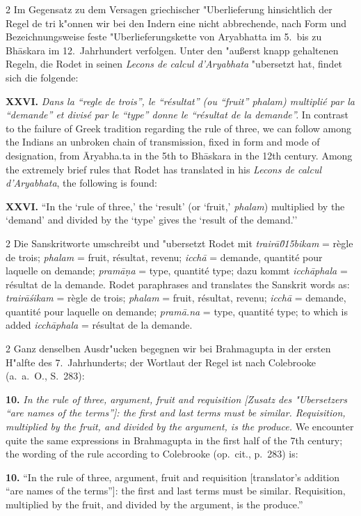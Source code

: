 \documentclass[10pt,a4paper]{article}
\renewcommand{\switchcolumn}{\syncronize\nointerlineskip\columnbreak}
\newcommand{\enquote}[1]{``#1''}
\begin{document}
\begin{paracol}{2}
Im Gegensatz zu dem Versagen griechischer "Uberlieferung hinsichtlich der Regel de tri k"onnen wir bei den Indern eine nicht abbrechende, nach Form und Bezeichnungsweise feste "Uberlieferungskette von Aryabhatta im 5.\ bis zu Bh\=askara im 12.\ Jahrhundert verfolgen. Unter den "au\ss{}erst knapp gehaltenen Regeln, die Rodet in seinen \textit{Lecons de calcul d'Aryabhata} "ubersetzt hat, findet sich die folgende:

\textbf{XXVI.} \textit{Dans la \enquote{regle de trois}, le \enquote{r\'esultat} (ou \enquote{fruit} \textit{phalam}) multipli\'e par la \enquote{demande} et divis\'e par le \enquote{type} donne le \enquote{r\'esultat de la demande}.}
\switchcolumn
In contrast to the failure of Greek tradition regarding the rule of three, we can follow among the Indians an unbroken chain of transmission, fixed in form and mode of designation, from \=Aryabha.ta in the 5th to Bh\=askara in the 12th century. Among the extremely brief rules that Rodet has translated in his \textit{Lecons de calcul d'Aryabhata}, the following is found:

\textbf{XXVI.} ``In the `rule of three,' the `result' (or `fruit,' \textit{phalam}) multiplied by the `demand' and divided by the `type' gives the `result of the demand.''
\end{paracol}

\begin{paracol}{2}
Die Sanskritworte umschreibt und "ubersetzt Rodet mit \textit{trair\=a\u015bikam} = r\`egle de trois; \textit{phalam} = fruit, r\'esultat, revenu; \textit{icch\=a} = demande, quantit\'e pour laquelle on demande; \textit{pram\=a\d{n}a} = type, quantit\'e type; dazu kommt \textit{icch\=aphala} = r\'esultat de la demande.
\switchcolumn
Rodet paraphrases and translates the Sanskrit words as: \textit{trair\=a\'sikam} = r\`egle de trois; \textit{phalam} = fruit, r\'esultat, revenu; \textit{icch\=a} = demande, quantit\'e pour laquelle on demande; \textit{pram\=a.na} = type, quantit\'e type; to which is added \textit{icch\=aphala} = r\'esultat de la demande.
\end{paracol}

\begin{paracol}{2}
Ganz denselben Ausdr"ucken begegnen wir bei Brahmagupta in der ersten H"alfte des 7.\ Jahrhunderts; der Wortlaut der Regel ist nach Colebrooke (a.\ a.\ O., S.\ 283):

\textbf{10.} \textit{In the rule of three, argument, fruit and requisition [Zusatz des "Ubersetzers \enquote{are names of the terms}]: the first and last terms must be similar. Requisition, multiplied by the fruit, and divided by the argument, is the produce.}
\switchcolumn
We encounter quite the same expressions in Brahmagupta in the first half of the 7th century; the wording of the rule according to Colebrooke (op.\ cit., p.\ 283) is:

\textbf{10.} ``In the rule of three, argument, fruit and requisition [translator's addition ``are names of the terms'']: the first and last terms must be similar. Requisition, multiplied by the fruit, and divided by the argument, is the produce.''
\end{paracol}
\end{document}
